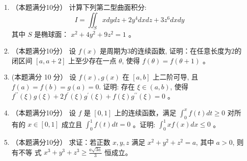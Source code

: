\begin{enumerate}
{\begin{enumerate}
	\end{enumerate}
}



\newpage
\item 
（本题满分10分）
计算下列第二型曲面积分:
\[
I=\iint_{S} x d y d z+2 y^{4} d x d z+3 z^{6} d x d y
\]
其中 $S$ 是椭球面： $x^{2}+4 y^{2}+9 z^{2}=1$ 。





\item 
（本题满分10分）
设 $f(x)$ 是周期为$  3  $的连续函数, 证明：在任意长度为$  2  $的闭区间
$[a, a+2]$ 上至少存在一点 $\theta$, 使得 $f(\theta)=f(\theta+1)$ 。




\item 
(本题满分 10 分）
设 $f(x), g(x)$ 在 $[a, b]$ 上二阶可导, 且 $f(a)=f(b)=g(a)=0$. 证明: 存在 $\xi \in(a, b)$, 使得 $f^{\prime \prime}(\xi) g(\xi)+2 f^{\prime}(\xi) g^{\prime}(\xi)+f(\xi) g^{\prime \prime}(\xi)=0$ 。




\item 
（本题满分10分）
设 $f$ 是 $[0,1]$ 上的连续函数，满足 $\int_{0}^{x} f(t) d t \geq 0$ 对所有的 $x \in[0,1]$ 成立且 $\int_{0}^{1} f(t) d t=0$ 。证明: $\int_{0}^{1} x f(x) d x \leq 0$ 。





\item 
（本题满分10分）
求证：若正数 $x, y, z$ 满足 $x^{2}+y^{2}+z^{2}=a$, 其中 $a>0$, 则有不等
式 $x^{3}+y^{3}+z^{3} \geq \frac{a \sqrt{3 a}}{3}$ 恒成立。


	
\end{enumerate}


